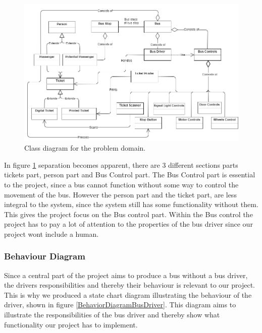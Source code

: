 \begin{figure}[H]
\centering
\includegraphics[scale=0.49]{Images/problem_domain_class_diagram.png}
\caption{Class diagram for the problem domain.}
\label{problem-domain-class-diagram}
\end{figure}

In figure \ref{problem-domain-class-diagram} separation becomes apparent, there are 3 different sections parts tickets part, person part and Bus Control part. The Bus Control part is essential to the project, since a bus cannot function without some way to control the movement of the bus. However the person part and the ticket part, are less integral to the system, since the system still has some functionality without them. This gives the project focus on the Bus control part. Within the Bus control the project has to pay a lot of attention to the properties of the bus driver since our project wont include a human.


\subsubsection{Behaviour Diagram}

Since a central part of the project aims to produce a bus without a bus driver, the drivers responsibilities and thereby their behaviour is relevant to our project. This is why we produced a state chart diagram illustrating the behaviour of the driver, shown in figure \ref{BehaviorDiagramBusDriver}. This diagram aims to illustrate the responsibilities of the bus driver and thereby show what functionality our project has to implement.

